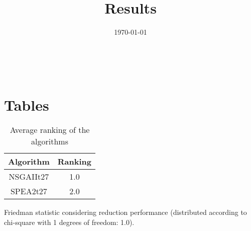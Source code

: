 \documentclass{article}
\title{Results}
\author{}
\date{\today}
\begin{document}
\oddsidemargin 0in \topmargin 0in\maketitle
\
\section{Tables}
\begin{table}[!htp]
\centering
\caption{Average ranking of the algorithms}
\begin{tabular}{c|c}
Algorithm&Ranking\\
\hline
NSGAIIt27&1.0\\
SPEA2t27&2.0\\
\end{tabular}
\end{table}


Friedman statistic considering reduction performance (distributed according to chi-square with 1 degrees of freedom: 1.0).
\end{document}

